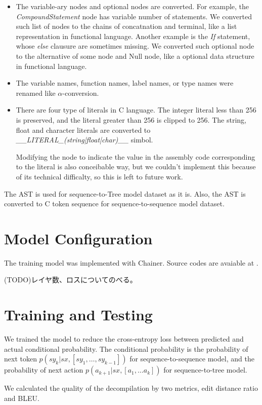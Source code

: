 \documentclass[senior,final,11pt]{iscs-thesis}
\begin{document}
\begin{itemize}
\item The variable-ary nodes and optional nodes are converted. 
For example, the {\sl CompoundStatement} node has variable number of statements. 
We converted such list of nodes to the chains of concatnation and terminal, like a list representation in functional language.
Another example is the  {\sl If} statement, whose {\sl else} clausure are sometimes missing. 
We converted such optional node to the alternative of some node and Null node, like a optional data structure in functional language.
\item The variable names, function names, label names, or type names were renamed like $\alpha$-conversion.
\item There are four type of literals in C language. 
The integer literal less than 256 is preserved, and the literal greater than 256 is clipped to 256.
The string, float and character literals are converted to {\sl \_\_LITERAL\_(string|float|char)\_\_} simbol.

Modifying the node to indicate the value in the assembly code corresponding to the literal is also conceibable way,
but we couldn't implement this because of its technical difficalty, so this is left to future work.
\end{itemize}

The AST is used for sequence-to-Tree model dataset as it is.
Also, the AST is converted to C token sequence for sequence-to-sequence model dataset. 


\section{Model Configuration}
The training model was implemented with Chainer. Source codes are avaiable at \url{}.


(TODO)レイヤ数、ロスについてのべる。

\section{Training and Testing}
We trained the model to reduce the cross-entropy loss between predicted and actual conditional probability.
The conditional probability is the probability of next token $ p(sy_k|sx,[sy_1,\dots,sy_{k-1}]) $ for sequence-to-sequence model, 
and the probability of next action $p(a_{k+1}|sx,[a_1, \dots a_{k}]) $ for sequence-to-tree model.

We calculated the quality of the decompilation by two metrics, edit distance ratio and BLEU.
\end{document}
